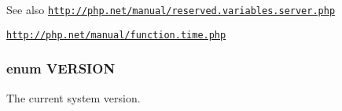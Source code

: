 \begin{DoxySeeAlso}{See also}
\href{http://php.net/manual/reserved.variables.server.php}{\tt http://php.net/manual/reserved.variables.server.php} 

\href{http://php.net/manual/function.time.php}{\tt http://php.net/manual/function.time.php} 
\end{DoxySeeAlso}
\hypertarget{bootstrap_8inc_ae48ea820d6b3acc7353b763034c772af}{
\subsubsection[{VERSION}]{\setlength{\rightskip}{0pt plus 5cm}enum {\bf VERSION}}}
\label{bootstrap_8inc_ae48ea820d6b3acc7353b763034c772af}
The current system version. 

